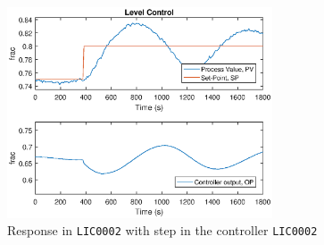 \documentclass[a4paper]{scrartcl}
\begin{document}
\begin{figure}[ht!]
	\centering
	\includegraphics[width=0.7\textwidth]{fig/untuned/LIC0002_step2_untuned.eps}
	\caption{Response in \texttt{LIC0002} with step in the controller \texttt{LIC0002}}
	\label{fig:5a4}
\end{figure}
\end{document}
